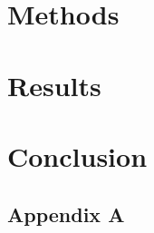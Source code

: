 \documentclass[10pt, letterpaper]{report}
\begin{document}
\chapter{Methods}
\label{sec:methods}


\chapter{Results}
\label{sec:results}


\chapter{Conclusion}
\label{sec:conclusion}




\begin{appendices}

\chapter{Appendix A}
\label{app:appendix_a}


\end{appendices}
\end{document}
